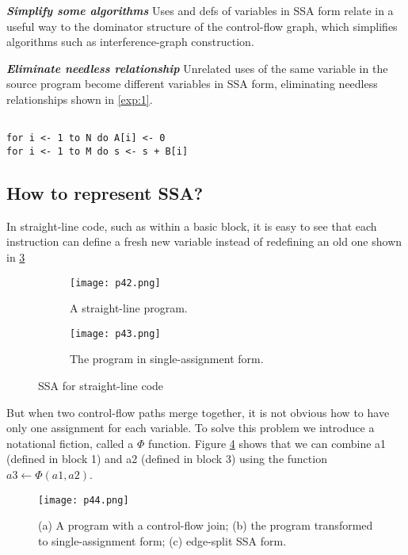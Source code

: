 \textbf{ \large \textit{Simplify some algorithms}} Uses and defs of variables in SSA form relate in a useful way to the dominator structure of the control-flow graph, which simplifies algorithms such as interference-graph construction.


\textbf{ \large \textit{Eliminate needless relationship}} Unrelated uses of the same variable in the source program become different variables in SSA form, eliminating needless relationships shown in \ref{exp:1}.

\begin{lstlisting}[label={exp:1},caption={An example}]

for i <- 1 to N do A[i] <- 0
for i <- 1 to M do s <- s + B[i]

\end{lstlisting}


\subsection{How to represent SSA?}

In straight-line code, such as within a basic block, it is easy to see that each instruction can define a fresh new variable instead of redefining an old one shown in \ref{fig:p42-43}


\begin{figure}[htb]
     \centering
     \begin{subfigure}{0.2\textwidth}
     \centering
         \texttt{[image: p42.png]}
         \caption{A straight-line program.}
         \label{fig:p42}
     \end{subfigure}
     \begin{subfigure}{0.25\textwidth}
     \centering
         \texttt{[image: p43.png]}
         \caption{The program in single-assignment form.}
         \label{fig:p43}
     \end{subfigure}
        \caption{SSA for straight-line code}
        \label{fig:p42-43}
\end{figure}


But when two control-flow paths merge together, it is not obvious how to have only one assignment for each variable. To solve this problem we introduce a notational fiction, called a $\Phi$ function. Figure \ref{fig:p44} shows that we can combine a1 (defined in block 1) and a2 (defined in block 3) using the function $a3 \leftarrow \Phi(a1, a2)$.


\begin{figure}[htb]
    \centering
    \texttt{[image: p44.png]}
    \caption{(a) A program with a control-flow join; (b) the program transformed to single-assignment form; (c) edge-split SSA form.}
    \label{fig:p44}
\end{figure}


